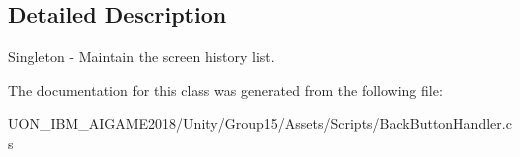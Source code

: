 \subsection{Detailed Description}
Singleton -\/ Maintain the screen history list. 

The documentation for this class was generated from the following file\+:\begin{DoxyCompactItemize}
\item 
U\+O\+N\+\_\+\+I\+B\+M\+\_\+\+A\+I\+G\+A\+M\+E2018/\+Unity/\+Group15/\+Assets/\+Scripts/Back\+Button\+Handler.\+cs\end{DoxyCompactItemize}
